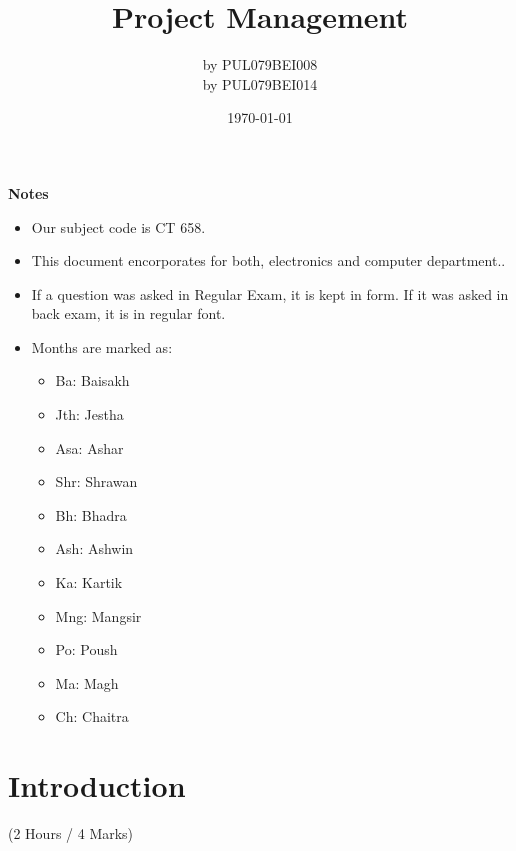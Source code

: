 \documentclass[12pt]{article}
\title{Project Management}
\author{by PUL079BEI008\\by PUL079BEI014}
\date{\today}
\begin{document}
\maketitle
\vspace{10.5cm}
\textbf{Notes}
\begin{itemize}[noitemsep]
	\item Our subject code is CT 658.
	\item This document encorporates for both, electronics and computer department..
	\item If a question was asked in Regular Exam, it is kept in  form. If it was asked in back exam, it is in regular font.
	\item Months are marked as: 
	\begin{itemize}[noitemsep, topsep=0pt]
		\item Ba: Baisakh
		\item Jth: Jestha
		\item Asa: Ashar
		\item Shr: Shrawan
		\item Bh: Bhadra
		\item Ash: Ashwin
		\item Ka: Kartik
		\item Mng: Mangsir
		\item Po: Poush
		\item Ma: Magh
		\item Ch: Chaitra
	\end{itemize}
\end{itemize}
\pagebreak
\tableofcontents
\pagebreak

\section{Introduction}
  \begin{center}(2 Hours / 4 Marks)\end{center}
\end{document}
